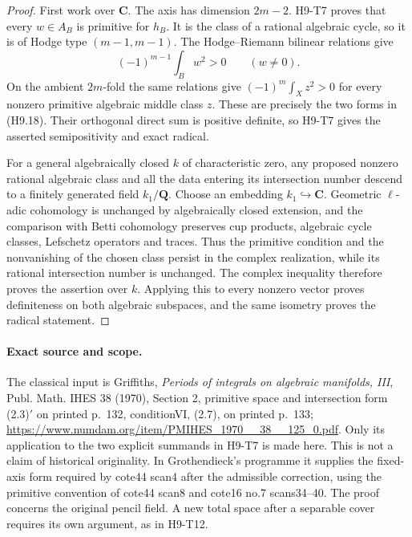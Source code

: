 \documentclass[11pt,a4paper]{article}
\begin{document}
\begin{proof}
First work over $\mathbf C$. The axis has dimension $2m-2$.
H9-T7 proves that every $w\in A_B$ is primitive for $h_B$.
It is the class of a rational algebraic cycle, so it is of Hodge
type $(m-1,m-1)$. The Hodge--Riemann bilinear relations give
\[
             (-1)^{m-1}\int_B w^2>0\qquad(w\ne0).
\]
On the ambient $2m$-fold the same relations give
$(-1)^m\int_X z^2>0$ for every nonzero primitive algebraic
middle class $z$. These are precisely the two forms in (H9.18).
Their orthogonal direct sum is positive definite, so H9-T7 gives
the asserted semipositivity and exact radical.

For a general algebraically closed $k$ of characteristic zero,
any proposed nonzero rational algebraic class and all the data
entering its intersection number descend to a finitely generated
field $k_1/\mathbf Q$. Choose an embedding $k_1\hookrightarrow
\mathbf C$. Geometric $\ell$-adic cohomology is unchanged by
algebraically closed extension, and the comparison with Betti
cohomology preserves cup products, algebraic cycle classes,
Lefschetz operators and traces. Thus the primitive condition and
the nonvanishing of the chosen class persist in the complex
realization, while its rational intersection number is unchanged.
The complex inequality therefore proves the assertion over $k$.
Applying this to every nonzero vector proves definiteness on both
algebraic subspaces, and the same isometry proves the radical
statement.
\end{proof}

\paragraph{Exact source and scope.}
The classical input is Griffiths, \emph{Periods of integrals on
algebraic manifolds, III}, Publ. Math. IHES 38 (1970), Section 2,
primitive space and intersection form (2.3)$'$ on printed p.~132,
conditionVI, (2.7), on printed p.~133;
\url{https://www.numdam.org/item/PMIHES_1970__38__125_0.pdf}.
Only its application to the two explicit summands in H9-T7 is
made here. This is not a claim of historical originality. In
Grothendieck's programme it supplies the fixed-axis form required
by cote44 scan4 after the admissible correction, using the
primitive convention of cote44 scan8 and cote16 no.7 scans34--40.
The proof concerns the original pencil field. A new total space
after a separable cover requires its own argument, as in H9-T12.


\end{document}
